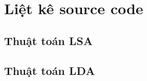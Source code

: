 
\chapter{Liệt kê source code} %

\label{AppendixB} %


%
%
%
%



%
%
%
%



\section{Thuật toán LSA}


\newpage

\section{Thuật toán LDA}

